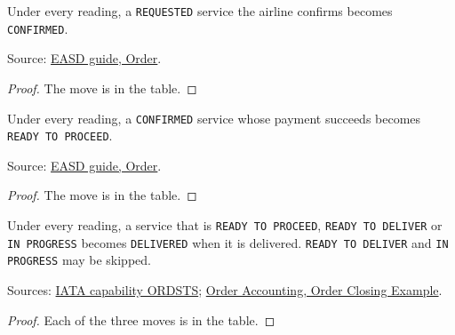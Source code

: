 \begin{theorem}
  \label{thm:delivery-confirm}
  Under every reading, a \texttt{REQUESTED} service the airline confirms
  becomes \texttt{CONFIRMED}.

  Source: \href{https://standards.atlassian.net/wiki/spaces/EASD/pages/574849062/Order}{EASD guide, Order}.
\end{theorem}
\begin{proof}
  The move is in the table.
\end{proof}

\begin{theorem}
  \label{thm:delivery-pay}
  Under every reading, a \texttt{CONFIRMED} service whose payment succeeds
  becomes \texttt{READY TO PROCEED}.

  Source: \href{https://standards.atlassian.net/wiki/spaces/EASD/pages/574849062/Order}{EASD guide, Order}.
\end{theorem}
\begin{proof}
  The move is in the table.
\end{proof}

\begin{theorem}
  \label{thm:delivery-deliver}
  Under every reading, a service that is \texttt{READY TO PROCEED},
  \texttt{READY TO DELIVER} or \texttt{IN PROGRESS} becomes
  \texttt{DELIVERED} when it is delivered.  \texttt{READY TO DELIVER} and
  \texttt{IN PROGRESS} may be skipped.

  Sources: \href{https://retailing.iata.org/armi/docs/ORDSTS/}{IATA capability ORDSTS};
  \href{https://standards.atlassian.net/wiki/spaces/OA/pages/2531491864}{Order Accounting, Order Closing Example}.
\end{theorem}
\begin{proof}
  Each of the three moves is in the table.
\end{proof}


